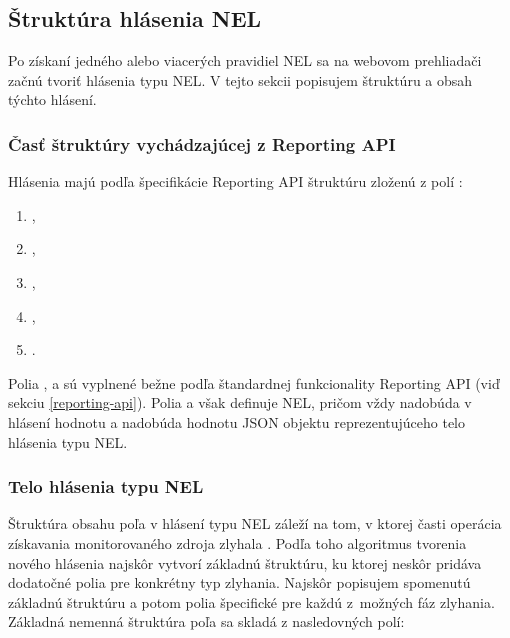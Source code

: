 \subsection{Štruktúra hlásenia NEL}
\label{struktura-hlasenia-nel}

Po získaní jedného alebo viacerých pravidiel NEL sa na webovom prehliadači začnú tvoriť hlásenia typu NEL.
V tejto sekcii popisujem štruktúru a obsah týchto hlásení.

\subsubsection{Časť štruktúry vychádzajúcej z Reporting API}

Hlásenia majú podľa špecifikácie Reporting API štruktúru zloženú z polí \cite{W3C-NEL, W3C-reporting-api}:
\begin{enumerate}
    \item {},
    \item {},
    \item {} ,
    \item {},
    \item {}.
\end{enumerate}

Polia ,  a  sú vyplnené bežne podľa štandardnej funkcionality Reporting API (viď sekciu \ref{reporting-api}).
Polia  a  však definuje NEL, pričom  vždy nadobúda v hlásení hodnotu  a  nadobúda hodnotu JSON objektu reprezentujúceho telo hlásenia typu NEL.

\subsubsection{Telo hlásenia typu NEL}
\label{network-error-logging-spec-type}

Štruktúra obsahu poľa  v hlásení typu NEL záleží na tom, v ktorej časti operácia získavania monitorovaného zdroja zlyhala \cite{W3C-NEL}.
Podľa toho algoritmus tvorenia nového hlásenia najskôr vytvorí základnú štruktúru, ku ktorej neskôr pridáva dodatočné polia pre konkrétny typ zlyhania.
Najskôr popisujem spomenutú základnú štruktúru a potom polia špecifické pre každú \mbox{z možných} fáz zlyhania.
Základná nemenná štruktúra poľa  sa skladá z nasledovných polí:

